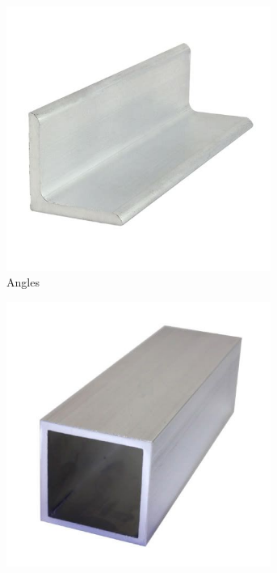 \documentclass[10pt,letterpaper]{book}
\begin{document}
  \begin{figure}[H]
	\begin{subfigure}[b]{.24\linewidth}
		\includegraphics[width=0.95\textwidth]{imgs/extrusion_angle.jpeg}
		\caption{Angles}
	\end{subfigure} \begin{subfigure}[b]{.24\linewidth}
		\includegraphics[width=0.95\textwidth]{imgs/extrusion_boxtube.jpeg}

\end{subfigure}
\end{figure}
\end{document}
